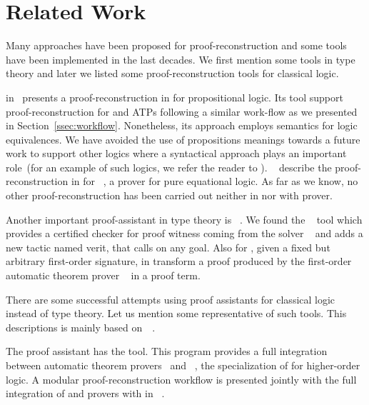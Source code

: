 \documentclass[../main.tex]{subfiles}
\begin{document}

\section{Related Work}
\label{sec:related-work}

Many approaches have been proposed for proof-reconstruction and some tools have
been implemented in the last decades. We first mention some tools in type
theory and later we listed some proof-reconstruction tools for classical logic.

\citeauthor{Kanso2012} in~\cite{Kanso2012,kanso2016light} presents a
proof-reconstruction in \Agda for propositional logic. Its tool support
proof-reconstruction for  and  ATPs following a similar work-flow as we presented in Section~\ref{ssec:workflow}.
Nonetheless, its approach
employs semantics for logic equivalences. We have avoided the use of
propositions meanings towards a future work to support other logics where a
syntactical approach plays an important role~(for an example of such logics, we
refer the reader to \cite{Agudelo-Agudelo2017}).
\citeauthor{foster2011integrating}~\cite{foster2011integrating} describe  the
proof-reconstruction in \Agda for ~\cite{hillenbrand1997}, a
prover for pure equational logic. As far as we know, no other
proof-reconstruction has been carried out neither in \Agda nor with \Metis prover.

Another important proof-assistant in type theory is ~\cite{coqteam}.
We found the ~\cite{armand2011,Ekici2017} tool which provides a
certified checker for proof witness coming from the \SMT solver
~\cite{bouton2009} and adds a new tactic named verit, that calls
 on any  goal. Also for , given a fixed but
arbitrary first-order signature, \citeauthor{Bezem2002} in \cite{Bezem2002}
transform a proof produced by the first-order automatic theorem prover
~\cite{deNivelle2003} in a  proof term.

There are some successful attempts using proof assistants for classical logic
instead of type theory.
Let us mention some representative of such tools. This descriptions is
mainly based on~\citeauthor{Sicard-Ramirez2016}~\cite{Sicard-Ramirez2016}.

The  proof assistant has the  tool.
This program provides a full integration between
automatic theorem provers~\cite{blanchette2013extending,Fleury2014,bohme2010} and
~\cite{nipkow2002isabelle}, the specialization of
 for higher-order logic.
A modular proof-reconstruction workflow is presented jointly with
the full integration of  and  provers with
 in \citeauthor{Een2004}~\cite{Een2004}.
\end{document}

